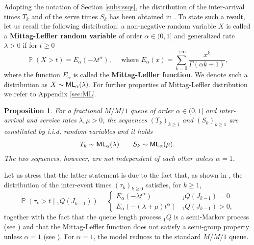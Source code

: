 \documentclass[]{amsart}
\numberwithin{equation}{section}
\newtheorem{prop}[thm]{Proposition}
\theoremstyle{remark}
\theoremstyle{definition}
\DeclareMathOperator{\bP}{\mathbb{P}}
\begin{document}
Adopting the notation of Section \ref{subs:ssqs}, the distribution of the inter-arrival times $T_k$ and of the serve times $S_k$ has been obtained in \cite[Proposition $7$]{ascione2022skorokhod}. {To state such a result, let us recall the following distribution: a non-negative random variable $X$ is called a \textbf{Mittag-Leffler random variable} of order $\alpha \in (0,1]$ and generalized rate $\lambda>0$ if for $t \ge 0$
\begin{equation*}
	\bP(X>t)=E_\alpha(-\lambda t^\alpha), \quad \mbox{ where }E_\alpha(x)=\sum_{k=0}^{+\infty}\frac{x^k}{\Gamma(\alpha k+1)},
\end{equation*}
where the function $E_\alpha$ is called the \textbf{Mittag-Leffler function}. We denote such a distribution as $X \sim {\sf ML}_\alpha(\lambda)$. For further properties of Mittag-Leffler distribution we refer to Appendix \ref{sec:ML}.}
\begin{prop}
	For a fractional $M/M/1$ queue of order $\alpha \in (0,1]$ and inter-arrival and service rates $\lambda,\mu>0$, the sequences $(T_k)_{k \ge 1}$ and $(S_k)_{k \ge 1}$ are constituted by i.i.d. random variables and it holds
	\begin{equation*}
		T_k \sim {\sf ML}_\alpha(\lambda) \qquad S_k \sim {\sf ML}_\alpha(\mu).
	\end{equation*}
	The two sequences, however, are not independent of each other unless $\alpha=1$.
\end{prop}
Let us stress that the latter statement is due to the fact that, as shown in \cite{cahoy2015transient}, the distribution of the inter-event times $(\tau_{k})_{k \ge 0}$ satisfies, for $k \ge 1$,
\begin{equation}\label{eq:interevent1}
	\bP(\tau_k>t \mid {}_1Q(J_{k-1}))=\begin{cases} E_\alpha(-\lambda t^\alpha) & {}_1Q(J_{k-1})=0 \\
		E_\alpha(-(\lambda+\mu) t^\alpha) & {}_1Q(J_{k-1})>0,
	\end{cases}
\end{equation}
together with the fact that the queue length process ${}_1Q$ is a semi-Markov process (see \cite[Example 2.13]{kaspi1988regenerative}) and that the Mittag-Leffler function does not satisfy a semi-group property unless $\alpha=1$ (see \cite{peng2010note}). For $\alpha=1$, the model reduces to the standard $M/M/1$ queue. 
\end{document}
